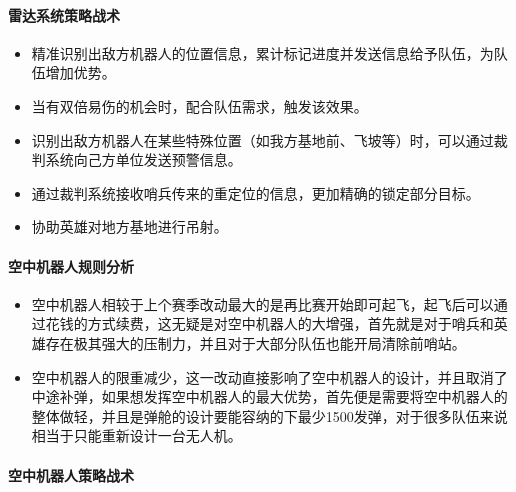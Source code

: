         \paragraph{雷达系统策略战术}

        
            \begin{itemize}
                \item 精准识别出敌方机器人的位置信息，累计标记进度并发送信息给予队伍，为队伍增加优势。
                \item 当有双倍易伤的机会时，配合队伍需求，触发该效果。
                \item 识别出敌方机器人在某些特殊位置（如我方基地前、飞坡等）时，可以通过裁判系统向己方单位发送预警信息。
                \item 通过裁判系统接收哨兵传来的重定位的信息，更加精确的锁定部分目标。
                \item 协助英雄对地方基地进行吊射。
            \end{itemize}

        \paragraph{空中机器人规则分析}

        
            \begin{itemize}
                \item 空中机器人相较于上个赛季改动最大的是再比赛开始即可起飞，起飞后可以通过花钱的方式续费，这无疑是对空中机器人的大增强，首先就是对于哨兵和英雄存在极其强大的压制力，并且对于大部分队伍也能开局清除前哨站。
                \item 空中机器人的限重减少，这一改动直接影响了空中机器人的设计，并且取消了中途补弹，如果想发挥空中机器人的最大优势，首先便是需要将空中机器人的整体做轻，并且是弹舱的设计要能容纳的下最少1500发弹，对于很多队伍来说相当于只能重新设计一台无人机。
            \end{itemize}

        \paragraph{空中机器人策略战术}

    
